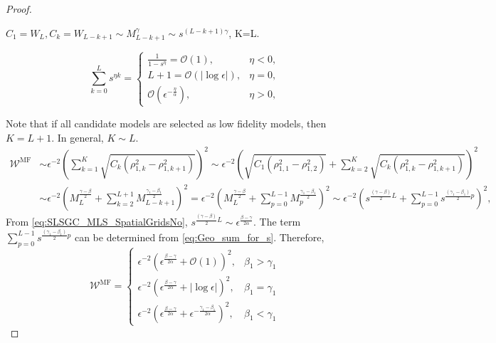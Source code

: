 \begin{proof}\label{eq:Sample_cost_est}

$C_1=W_L, C_k = W_{L-k+1}\sim M_{L-k+1}^\gamma\sim s^{(L-k+1)\gamma}$, K=L.

%
\begin{equation}
\label{eq:Geo_sum_for_s}
\sum_{k=0}^L s^{\eta k}=\left\{\begin{array}{ll}
\frac{1}{1-s^{\eta}}=\mathcal{O}\left(1\right), & \eta<0,\\
L+1 = \mathcal{O}\left(|\log \epsilon|\right), & \eta = 0,\\
\mathcal{O}\left(\epsilon^{-\frac{\eta}{\alpha}}\right), & \eta>0,
\end{array}
\right.
\end{equation}
%

Note that if all candidate models are selected as low fidelity models, then $K=L+1$. In general, $K\sim L$.
%
\begin{align*}
    \mathcal{W}^\text{MF} &\sim \epsilon^{-2} \left(\sum_{k=1}^K\sqrt{C_k\left(\rho_{1,k}^2 - \rho_{1,k+1}^2\right)}\right)^2 \sim \epsilon^{-2}\left(\sqrt{C_1\left(\rho_{1,1}^2 - \rho_{1,2}^2\right)}+\sum_{k=2}^K \sqrt{C_k\left(\rho_{1,k}^2 - \rho_{1,k+1}^2\right)} \right)^2\\
    &\sim \epsilon^{-2} \left(M_L^{\frac{\gamma-\beta}{2}}+\sum_{k=2}^{L+1}M_{L-k+1}^\frac{\gamma_1-\beta_1}{2}\right)^2=\epsilon^{-2} \left(M_L^{\frac{\gamma-\beta}{2}}+\sum_{p=0}^{L-1}M_{p}^\frac{\gamma_1-\beta_1}{2}\right)^2\sim \epsilon^{-2}\left(s^{\frac{(\gamma-\beta)}{2}L}+\sum_{p=0}^{L-1}s^{\frac{(\gamma_1-\beta_1)}{2}p}\right)^2,
\end{align*}
%
From \eqref{eq:SLSGC_MLS_SpatialGridsNo}, $s^{\frac{(\gamma-\beta)}{2}L}\sim \epsilon^{\frac{\beta-\gamma}{2\alpha}}$. The term $\sum_{p=0}^{L-1}s^{\frac{(\gamma_1-\beta_1)}{2}p}$ can be determined from \eqref{eq:Geo_sum_for_s}. Therefore, 
\[
\mathcal{W}^\text{MF} = \left\{\begin{array}{ll}
\epsilon^{-2}\left(\epsilon^{\frac{\beta-\gamma}{2\alpha}}+\mathcal{O}(1)\right)^2, & \beta_1>\gamma_1\\
\epsilon^{-2}\left(\epsilon^{\frac{\beta-\gamma}{2\alpha}}+|\log\epsilon|\right)^2, & \beta_1=\gamma_1\\
\epsilon^{-2}\left(\epsilon^{\frac{\beta-\gamma}{2\alpha}}+\epsilon^{-\frac{\gamma_1-\beta_1}{2\alpha}}\right)^2, & \beta_1<\gamma_1
\end{array}
\right.
\]




\end{proof}
